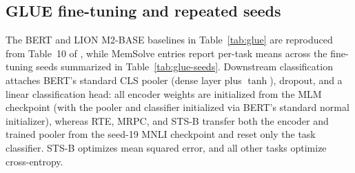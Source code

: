 \documentclass[10pt,twocolumn]{article}
\begin{document}
\FloatBarrier
\subsection{GLUE fine-tuning and repeated seeds}
\label{app:glue}

The BERT and LION M2-BASE \cite{fu2023monarch} baselines in
Table~\ref{tab:glue} are reproduced from Table~10 of \cite{afzal2025lion},
while MemSolve entries report per-task means across the fine-tuning seeds
summarized in Table~\ref{tab:glue-seeds}.
Downstream classification attaches BERT's standard CLS pooler (dense layer
plus $\tanh$), dropout, and a linear classification head: all encoder weights
are initialized from the MLM checkpoint (with the pooler and classifier
initialized via BERT's standard normal initializer), whereas RTE, MRPC, and
STS-B transfer both the encoder and trained pooler from the seed-19 MNLI
checkpoint and reset only the task classifier.
STS-B optimizes mean squared error, and all other tasks optimize
cross-entropy.
\end{document}
